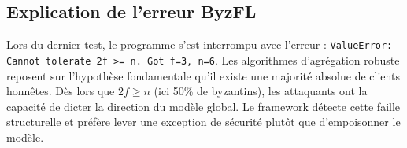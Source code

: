 \documentclass[11pt, a4paper]{article}
\begin{document}
\subsection{Explication de l'erreur ByzFL}
Lors du dernier test, le programme s'est interrompu avec l'erreur : \texttt{ValueError: Cannot tolerate 2f >= n. Got f=3, n=6}. 
Les algorithmes d'agrégation robuste reposent sur l'hypothèse fondamentale qu'il existe une majorité absolue de clients honnêtes. Dès lors que $2f \ge n$ (ici 50\% de byzantins), les attaquants ont la capacité de dicter la direction du modèle global. Le framework détecte cette faille structurelle et préfère lever une exception de sécurité plutôt que d'empoisonner le modèle.
\end{document}
